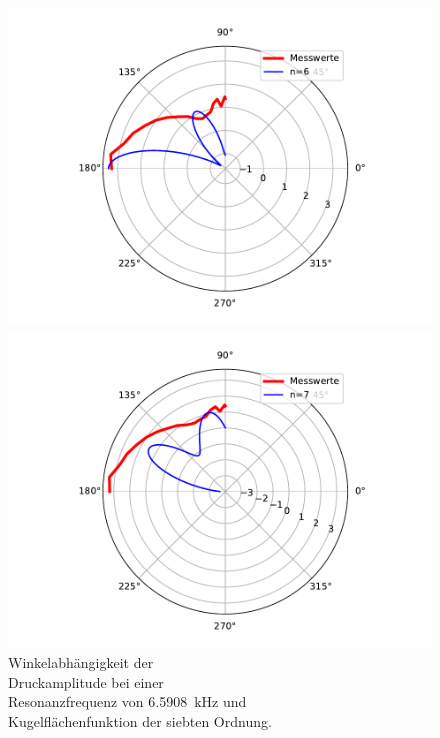 \begin{figure}
    \hspace*{2cm}
    \begin{minipage}[b]{.4\linewidth} %
        \hspace*{-2cm}
        \includegraphics[width=\linewidth]{figure/Resonanz_Drewinkel_Amplitude_6_n6.pdf}
        \caption{Winkelabhängigkeit der\\ Druckamplitude bei einer \\ Resonanzfrequenz von \SI{6.5908}{\kilo\hertz} und \\ Kugelflächenfunktion der sechsten Ordnung.}
     \end{minipage}
     \hspace{.1\linewidth}%
     \begin{minipage}[b]{.4\linewidth} %
        \hspace*{-2cm}
        \includegraphics[width=\linewidth]{figure/Resonanz_Drewinkel_Amplitude_6_n7.pdf}
        \caption{Winkelabhängigkeit der\\ Druckamplitude bei einer \\ Resonanzfrequenz von \SI{6.5908}{\kilo\hertz} und \\ Kugelflächenfunktion der siebten Ordnung.}
        \label{fig:Resonanz_Drewinkel_Amplitude_6_n7}
     \end{minipage}
\end{figure}
